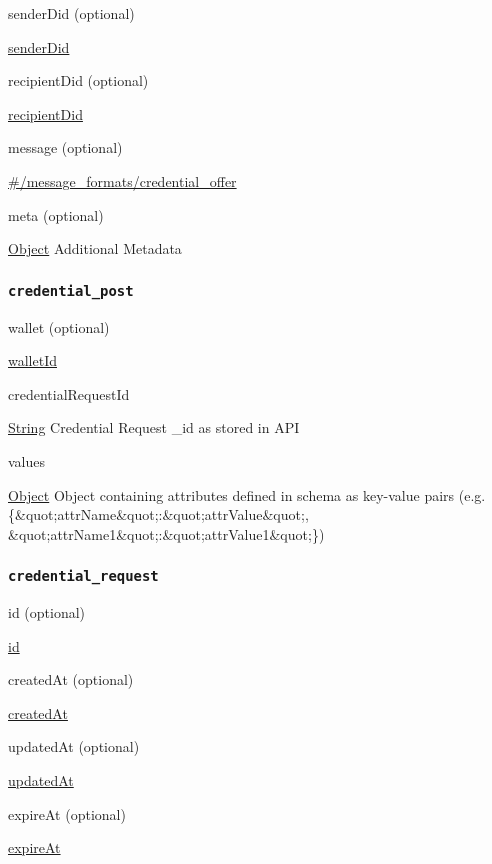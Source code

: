 senderDid (optional)

{\protect\hyperlink{senderDid}{senderDid}}

recipientDid (optional)

{\protect\hyperlink{recipientDid}{recipientDid}}

message (optional)

{\protect\hyperlink{ux5cux23ux2fmessage_formatsux2fcredential_offer}{\#/message\_formats/credential\_offer}}

meta (optional)

{\protect\hyperlink{object}{Object}} Additional Metadata

\hypertarget{credential_post}{%
\subsubsection{\texorpdfstring{\protect\hypertarget{credential_post}{}{\texttt{credential\_post}}}{credential\_post}}\label{credential_post}}

wallet (optional)

{\protect\hyperlink{walletId}{walletId}}

credentialRequestId

{\protect\hyperlink{string}{String}} Credential Request \_id as stored
in API

values

{\protect\hyperlink{object}{Object}} Object containing attributes
defined in schema as key-value pairs (e.g.
\{\&quot;attrName\&quot;:\&quot;attrValue\&quot;,
\&quot;attrName1\&quot;:\&quot;attrValue1\&quot;\})

\hypertarget{credential_request}{%
\subsubsection{\texorpdfstring{\protect\hypertarget{credential_request}{}{\texttt{credential\_request}}}{credential\_request}}\label{credential_request}}

id (optional)

{\protect\hyperlink{id}{id}}

createdAt (optional)

{\protect\hyperlink{createdAt}{createdAt}}

updatedAt (optional)

{\protect\hyperlink{updatedAt}{updatedAt}}

expireAt (optional)

{\protect\hyperlink{expireAt}{expireAt}}

